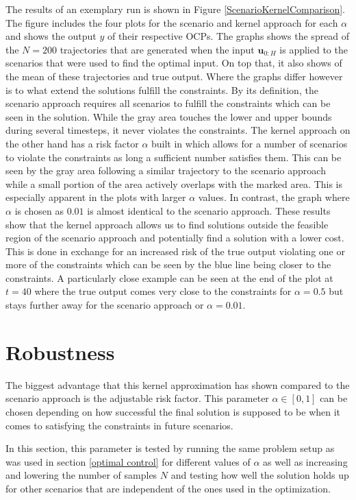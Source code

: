 The results of an exemplary run is shown in Figure \ref{ScenarioKernelComparison}. The figure includes the four plots for the scenario and kernel approach for each $\alpha$ and shows the output $y$ of their respective OCPs. The graphs shows the spread of the $N = 200$ trajectories that are generated when the input $\boldsymbol{u}_{0:H}$ is applied to the scenarios that were used to find the optimal input. On top that, it also shows of the mean of these trajectories and true output. Where the graphs differ however is to what extend the solutions fulfill the constraints. By its definition, the scenario approach requires all scenarios to fulfill the constraints which can be seen in the solution. While the gray area touches the lower and upper bounds during several timesteps, it never violates the constraints. The kernel approach on the other hand has a risk factor $\alpha$ built in which allows for a number of scenarios to violate the constraints as long a sufficient number satisfies them. This can be seen by the gray area following a similar trajectory to the scenario approach while a small portion of the area actively overlaps with the marked area. This is especially apparent in the plots with larger $\alpha$ values. In contrast, the graph where $\alpha$ is chosen as $0.01$ is almost identical to the scenario approach. These results show that the kernel approach allows us to find solutions outside the feasible region of the scenario approach and potentially find a solution with a lower cost. This is done in exchange for an increased risk of the true output violating one or more of the constraints which can be seen by the blue line being closer to the constraints. A particularly close example can be seen at the end of the plot at $t = 40$ where the true output comes very close to the constraints for $\alpha = 0.5$ but stays further away for the scenario approach or $\alpha = 0.01$.




\section{Robustness} \label{performance guarantees}

The biggest advantage that this kernel approximation has shown compared to the scenario approach is the adjustable risk factor. This parameter $\alpha \in [0, 1]$ can be chosen depending on how successful the final solution is supposed to be when it comes to satisfying the constraints in future scenarios. 

In this section, this parameter is tested by running the same problem setup as was used in section \ref{optimal control} for different values of $\alpha$ as well as increasing and lowering the number of samples $N$ and testing how well the solution holds up for other scenarios that are independent of the ones used in the optimization.

